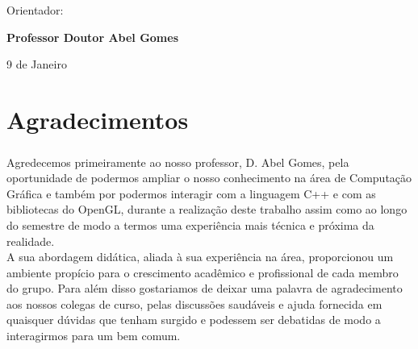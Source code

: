 \documentclass[12pt,a4paper]{memoir}
\begin{document}
\vspace{0,5cm}
\begin{center}
\begin{normalsize}
\begin{large}
Orientador:
\end{large}
\end{normalsize}
\end{center}

\begin{center}
\begin{large}
\textbf{Professor Doutor Abel Gomes}
\end{large}
\end{center}



\vspace{0.5cm}
\begin{center}
\begin{normalsize}
9 de Janeiro
\end{normalsize}
\end{center}

\clearpage{\thispagestyle{empty}\cleardoublepage}

\frontmatter

\acresetall



\chapter*{Agradecimentos}
\label{chap:agradec}
\paragraph{} 
Agredecemos primeiramente ao nosso professor, D. Abel Gomes, pela oportunidade de podermos ampliar o nosso conhecimento na área de Computação Gráfica e também por podermos interagir com a linguagem C++ e com as bibliotecas do OpenGL, durante a realização deste trabalho assim como ao longo do semestre de modo a termos uma experiência mais técnica e próxima da realidade. \\

A sua abordagem didática, aliada à sua experiência na área, proporcionou um ambiente propício para o crescimento acadêmico e profissional de cada membro do grupo. Para além disso gostariamos de deixar uma palavra de agradecimento aos nossos colegas de curso, pelas discussões saudáveis e ajuda fornecida em quaisquer dúvidas que tenham surgido e podessem ser debatidas de modo a interagirmos para um bem comum.\\
\end{document}
